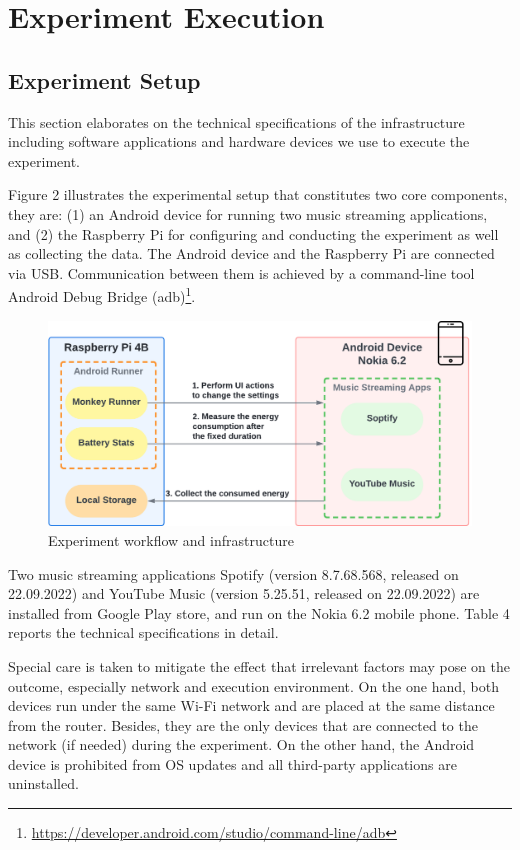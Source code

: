 \section{Experiment Execution}
\subsection{Experiment Setup}
This section elaborates on the technical specifications of the infrastructure including software applications and hardware devices we use to execute the experiment. 

	Figure 2 illustrates the experimental setup that constitutes two core components, they are: (1) an Android device for running two music streaming applications, and (2) the Raspberry Pi for configuring and conducting the experiment as well as collecting the data. The Android device and the Raspberry Pi are connected via USB. Communication between them is achieved by a command-line tool Android Debug Bridge (adb)\footnote{\label{note1}\href{ https://developer.android.com/studio/command-line/adb }{https://developer.android.com/studio/command-line/adb}}. 

\begin{figure}[htbp]
 \centering
 \includegraphics[width=0.8\linewidth]{figures/workflow.png}\textcolor{blue}{\caption{Experiment workflow and infrastructure}}
\end{figure}

Two music streaming applications Spotify (version 8.7.68.568, released on 22.09.2022) and YouTube Music (version 5.25.51, released on 22.09.2022) are installed from Google Play store, and run on the Nokia 6.2 mobile phone. Table 4 reports the technical specifications in detail.

Special care is taken to mitigate the effect that irrelevant factors may pose on the outcome, especially network and execution environment. On the one hand, both devices run under the same Wi-Fi network and are placed at the same distance from the router. Besides, they are the only devices that are connected to the network (if needed) during the experiment. On the other hand, the Android device is prohibited from OS updates and all third-party applications are uninstalled. 

